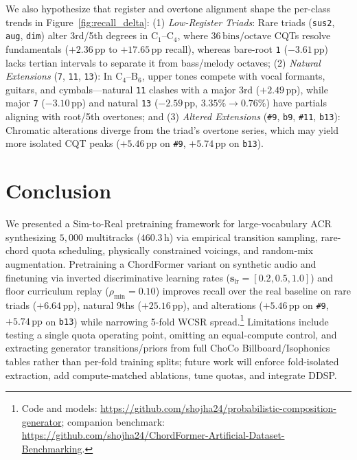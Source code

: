 \documentclass{article}
\begin{document}
We also hypothesize that register and overtone alignment shape the per-class trends in Figure~\ref{fig:recall_delta}: (1) \textit{Low-Register Triads}: Rare triads ({\small\texttt{sus2}}, {\small\texttt{aug}}, {\small\texttt{dim}}) alter 3rd/5th degrees in $\text{C}_1$--$\text{C}_4$, where $36\,\text{bins/octave}$ CQTs resolve fundamentals ($+2.36\,\text{pp}$ to $+17.65\,\text{pp}$ recall), whereas bare-root {\small\texttt{1}} ($-3.61\,\text{pp}$) lacks tertian intervals to separate it from bass/melody octaves; (2) \textit{Natural Extensions} ({\small\texttt{7}}, {\small\texttt{11}}, {\small\texttt{13}}): In $\text{C}_4$--$\text{B}_6$, upper tones compete with vocal formants, guitars, and cymbals---natural {\small\texttt{11}} clashes with a major 3rd ($+2.49\,\text{pp}$), while major {\small\texttt{7}} ($-3.10\,\text{pp}$) and natural {\small\texttt{13}} ($-2.59\,\text{pp}$, $3.35\% \!\to\! 0.76\%$) have partials aligning with root/5th overtones; and (3) \textit{Altered Extensions} ({\small\texttt{\#9}}, {\small\texttt{b9}}, {\small\texttt{\#11}}, {\small\texttt{b13}}): Chromatic alterations diverge from the triad's overtone series, which may yield more isolated CQT peaks ($+5.46\,\text{pp}$ on {\small\texttt{\#9}}, $+5.74\,\text{pp}$ on {\small\texttt{b13}}).
\section{Conclusion}\label{sec:conclusion}

We presented a Sim-to-Real pretraining framework for large-vocabulary ACR synthesizing $5{,}000$ multitracks ($460.3\,\text{h}$) via empirical transition sampling, rare-chord quota scheduling, physically constrained voicings, and random-mix augmentation. Pretraining a ChordFormer variant on synthetic audio and finetuning via inverted discriminative learning rates ($\mathbf{s}_{\text{lr}} = [0.2, 0.5, 1.0]$) and floor curriculum replay ($\rho_{\min}=0.10$) improves recall over the real baseline on rare triads ($+6.64\,\text{pp}$), natural 9ths ($+25.16\,\text{pp}$), and alterations ($+5.46\,\text{pp}$ on {\small\texttt{\#9}}, $+5.74\,\text{pp}$ on {\small\texttt{b13}}) while narrowing 5-fold WCSR spread.\footnote{Code and models: \url{https://github.com/shojha24/probabilistic-composition-generator}; companion benchmark: \url{https://github.com/shojha24/ChordFormer-Artificial-Dataset-Benchmarking}.} Limitations include testing a single quota operating point, omitting an equal-compute control, and extracting generator transitions/priors from full ChoCo Billboard/Isophonics tables rather than per-fold training splits; future work will enforce fold-isolated extraction, add compute-matched ablations, tune quotas, and integrate DDSP.

\clearpage

\end{document}
